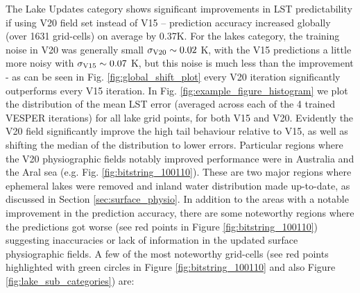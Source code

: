 \documentclass[hess, twostagejnl]{copernicus}
\begin{document}
The Lake Updates category shows significant improvements in LST predictability if using V20 field set instead of V15 – prediction accuracy increased globally (over 1631 grid-cells) on average by 0.37K. For the lakes category, the training noise in V20 was generally small $\sigma_{\rm V20} \sim 0.02$ K, with the V15 predictions a little more noisy with $\sigma_{\rm V15} \sim 0.07$ K, but this noise is much less than the improvement - as can be seen in Fig. \ref{fig:global_shift_plot} every V20 iteration significantly outperforms every V15 iteration. In Fig. \ref{fig:example_figure_histogram} we plot the distribution of the mean LST error (averaged across each of the 4 trained VESPER iterations) for all lake grid points, for both V15 and V20. Evidently the V20 field significantly improve the high tail behaviour relative to V15, as well as shifting the median of the distribution to lower errors. Particular regions where the V20 physiographic fields notably improved performance were in Australia and the Aral sea (e.g. Fig. \ref{fig:bitstring_100110}). These are two major regions where ephemeral lakes were removed and inland water distribution made up-to-date, as discussed in Section \ref{sec:surface_physio}. In addition to the areas with a notable improvement in the prediction accuracy, there are some noteworthy regions where the predictions got worse (see red points in Figure \ref{fig:bitstring_100110}) suggesting inaccuracies or lack of information in the updated surface physiographic fields. A few of the most noteworthy grid-cells (see red points highlighted with green circles in Figure \ref{fig:bitstring_100110} and also Figure \ref{fig:lake_sub_categories}) are:
\end{document}
